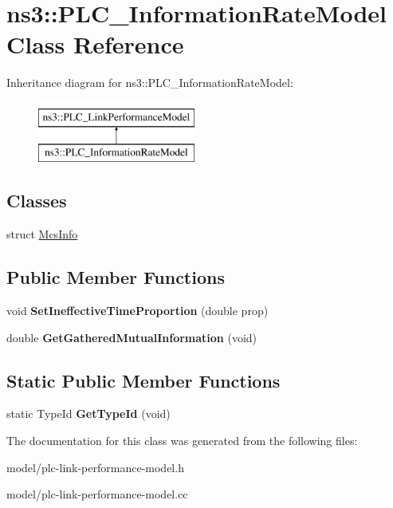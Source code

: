 \hypertarget{classns3_1_1PLC__InformationRateModel}{\section{ns3\-:\-:\-P\-L\-C\-\_\-\-Information\-Rate\-Model \-Class \-Reference}
\label{classns3_1_1PLC__InformationRateModel}
}
\-Inheritance diagram for ns3\-:\-:\-P\-L\-C\-\_\-\-Information\-Rate\-Model\-:\begin{figure}[H]
\begin{center}
\leavevmode
\includegraphics[height=2.000000cm]{classns3_1_1PLC__InformationRateModel}
\end{center}
\end{figure}
\subsection*{\-Classes}
\begin{DoxyCompactItemize}
\item 
struct \hyperlink{structns3_1_1PLC__InformationRateModel_1_1McsInfo}{\-Mcs\-Info}
\end{DoxyCompactItemize}
\subsection*{\-Public \-Member \-Functions}
\begin{DoxyCompactItemize}
\item 
\hypertarget{classns3_1_1PLC__InformationRateModel_a71cd6b53dfc6cbbbd8e77bd13cda3156}{void {\bfseries \-Set\-Ineffective\-Time\-Proportion} (double prop)}\label{classns3_1_1PLC__InformationRateModel_a71cd6b53dfc6cbbbd8e77bd13cda3156}

\item 
\hypertarget{classns3_1_1PLC__InformationRateModel_a8c4bb07a41da6731de7b135082a985ef}{double {\bfseries \-Get\-Gathered\-Mutual\-Information} (void)}\label{classns3_1_1PLC__InformationRateModel_a8c4bb07a41da6731de7b135082a985ef}

\end{DoxyCompactItemize}
\subsection*{\-Static \-Public \-Member \-Functions}
\begin{DoxyCompactItemize}
\item 
\hypertarget{classns3_1_1PLC__InformationRateModel_a4d419a2322b18a49f471c9b4392770e2}{static \-Type\-Id {\bfseries \-Get\-Type\-Id} (void)}\label{classns3_1_1PLC__InformationRateModel_a4d419a2322b18a49f471c9b4392770e2}

\end{DoxyCompactItemize}


\-The documentation for this class was generated from the following files\-:\begin{DoxyCompactItemize}
\item 
model/plc-\/link-\/performance-\/model.\-h\item 
model/plc-\/link-\/performance-\/model.\-cc\end{DoxyCompactItemize}
